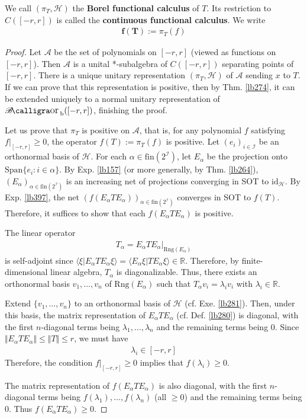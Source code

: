 \documentclass[12pt,b5paper,notitlepage]{article}
\theoremstyle{definition}
\theoremstyle{plain}
\DeclareMathOperator{\Borb}{{\mathscr{B}\text{\kern -2pt {\calligra\large or}}\,}_{\mathrm b}}
\newcommand{\id}{\mathrm{id}}
\newcommand{\Span}{\mathrm{Span}}
\newcommand{\bk}[1]{\langle {#1}\rangle}
\newcommand{\scr}{\mathscr}
\newcommand{\Rbb}{\mathbb R}
\newcommand{\Rng}{\mathrm{Rng}}
\newcommand{\fin}{\mathrm{fin}}
\newcommand{\MH}{\mathcal H}
\numberwithin{equation}{section}
\begin{document}
We call $(\pi_T,\MH)$ the \textbf{Borel functional calculus}  of $T$. Its restriction to $C([-r,r])$ is called the \textbf{continuous functional calculus}.  We write 
\begin{align*}
\pmb{f(T)}:=\pi_T(f)
\end{align*}


\begin{proof}
Let $\scr A$ be the set of polynomials on $[-r,r]$ (viewed as functions on $[-r,r]$). Then $\scr A$ is a unital *-subalgebra of $C([-r,r])$ separating points of $[-r,r]$. There is a unique unitary representation $(\pi_T,\MH)$ of $\scr A$ sending $x$ to $T$. If we can prove that this representation is positive, then by Thm. \ref{lb274}, it can be extended uniquely to a normal unitary representation of $\Borb([-r,r])$, finishing the proof.

Let us prove that $\pi_T$ is positive on $\scr A$, that is, for any polynomial $f$ satisfying $f|_{[-r,r]}\geq0$, the operator $f(T):=\pi_T(f)$ is positive. Let $(e_i)_{i\in\scr I}$ be an orthonormal basis of $\MH$. For each $\alpha\in\fin(2^{\scr I})$, let $E_\alpha$ be the projection onto $\Span\{e_i:i\in\alpha\}$. By Exp. \ref{lb157} (or more generally, by Thm. \ref{lb264}), $(E_\alpha)_{\alpha\in\fin(2^{\scr I})}$ is an increasing net of projections converging in SOT to $\id_\MH$. By Exp. \ref{lb397}, the net $(f(E_\alpha TE_\alpha))_{\alpha\in\fin(2^{\scr I})}$ converges in SOT to $f(T)$. Therefore, it suffices to show that each $f(E_\alpha TE_\alpha)$ is positive.


The linear operator
\begin{align*}
T_\alpha=E_\alpha TE_\alpha\big|_{\Rng(E_\alpha)}
\end{align*}
is self-adjoint since $\bk{\xi|E_\alpha TE_\alpha\xi}=\bk{E_\alpha\xi|TE_\alpha\xi}\in\Rbb$. Therefore, by finite-dimensional linear algebra, $T_\alpha$ is diagonalizable. Thus, there exists an orthonormal basis $v_1,\dots,v_n$ of $\Rng(E_\alpha)$ such that $T_\alpha v_i=\lambda_iv_i$ with $\lambda_i\in\Rbb$. 

Extend $\{v_1,\dots,v_n\}$ to an orthonormal basis of $\MH$ (cf. Exe. \ref{lb281}). Then, under this basis, the matrix representation of $E_\alpha TE_\alpha$ (cf. Def. \ref{lb280}) is diagonal, with the first $n$-diagonal terms being $\lambda_1,\dots,\lambda_n$ and the remaining terms being $0$. Since $\Vert E_\alpha TE_\alpha\Vert\leq\Vert T\Vert\leq r$, we must have
\begin{align*}
\lambda_i\in[-r,r]
\end{align*}
Therefore, the condition $f|_{[-r,r]}\geq0$ implies that $f(\lambda_i)\geq0$. 

The matrix representation of $f(E_\alpha TE_\alpha)$ is also diagonal, with the first $n$-diagonal terms being $f(\lambda_1),\dots,f(\lambda_n)$ (all $\geq0$) and the remaining terms being $0$. Thus $f(E_\alpha TE_\alpha)\geq0$.
\end{proof}
\end{document}
